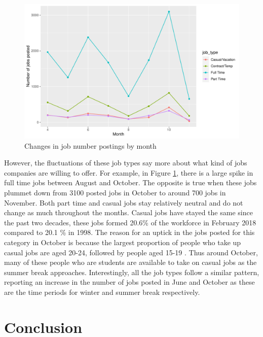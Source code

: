 \documentclass[11pt,a4paper,]{article}
\begin{document}
\begin{figure}

{\centering \includegraphics{Team_JHDP_Assignment4_files/figure-latex/job-count-fluctuations-1} 

}

\caption{Changes in job number postings by month}\label{fig:job-count-fluctuations}
\end{figure}

However, the fluctuations of these job types say more about what kind of jobs companies are willing to offer. For example, in Figure \ref{fig:job-count-fluctuations}, there is a large spike in full time jobs between August and October. The opposite is true when these jobs plummet down from 3100 posted jobs in October to around 700 jobs in November. Both part time and casual jobs stay relatively neutral and do not change as much throughout the months. Casual jobs have stayed the same since the past two decades, these jobs formed 20.6\% of the workforce in February 2018 compared to 20.1 \% in 1998. The reason for an uptick in the jobs posted for this category in October is because the largest proportion of people who take up casual jobs are aged 20-24, followed by people aged 15-19 \textcite{norman}. Thus around October, many of these people who are students are available to take on casual jobs as the summer break approaches. Interestingly, all the job types follow a similar pattern, reporting an increase in the number of jobs posted in June and October as these are the time periods for winter and summer break respectively.

\hypertarget{conclusion}{%
\section{Conclusion}\label{conclusion}}
\end{document}
